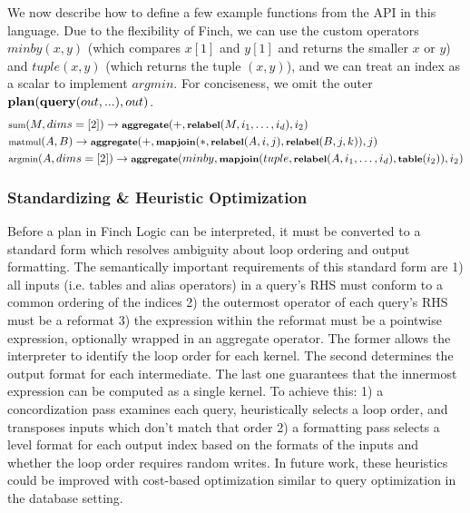 We now describe how to define a few example functions from the API in this language. Due to the flexibility of Finch, we can use the custom operators $minby(x,y)$ (which compares $x[1]$ and $y[1]$ and returns the smaller $x$ or $y$) and $tuple(x, y)$ (which returns the tuple $(x,y)$), and we can treat an index as a scalar to implement $argmin$. For conciseness, we omit the outer $\text{\textbf{plan}}(\text{\textbf{query}}(out,...),out)$.
\begin{align*}
&\footnotesize \text{sum}(M, dims=[2]) \rightarrow \text{\textbf{aggregate}}(+,\text{\textbf{relabel}}(M, i_1,\ldots,i_d), i_2)\\
&\footnotesize \text{matmul}(A, B) \rightarrow \text{\textbf{aggregate}}(+,\text{\textbf{mapjoin}}(*, \text{\textbf{relabel}}(A, i, j), \text{\textbf{relabel}}(B, j, k)), j)\\
&\footnotesize \text{argmin}(A, dims=[2]) \rightarrow \text{\textbf{aggregate}}(minby,\text{\textbf{mapjoin}}(tuple, \text{\textbf{relabel}}(A, i_1,\ldots,i_d), \text{\textbf{table}}(i_2)), i_2)
\end{align*}

\subsubsection{Standardizing \& Heuristic Optimization}
Before a plan in Finch Logic can be interpreted, it must be converted to a standard form which resolves ambiguity about loop ordering and output formatting. The semantically important requirements of this standard form are 1) all inputs (i.e. tables and alias operators) in a query's RHS must conform to a common ordering of the indices 2) the outermost operator of each query's RHS must be a reformat 3) the expression within the reformat must be a pointwise expression, optionally wrapped in an aggregate operator. The former allows the interpreter to identify the loop order for each kernel. The second determines the output format for each intermediate. The last one guarantees that the innermost expression can be computed as a single kernel. To achieve this: 1) a concordization pass examines each query, heuristically selects a loop order, and transposes inputs which don't match that order 2) a formatting pass selects a level format for each output index based on the formats of the inputs and whether the loop order requires random writes. In future work, these heuristics could be improved with cost-based optimization similar to query optimization in the database setting.

